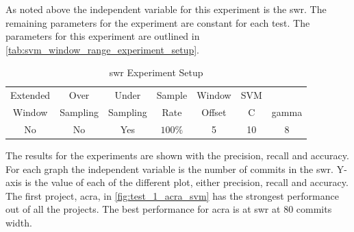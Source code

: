 
As noted above the independent variable for this experiment is the \gls{swr}. The remaining parameters for the experiment are constant for each test. The parameters for this experiment are outlined in \autoref{tab:svm_window_range_experiment_setup}.

\begin{table}[h]
\begin{center}

    \begin{tabular}{|c|c|c|c|c|cc|}
        \hline
        Extended & Over & Under & Sample & Window & SVM & \\
        Window & Sampling & Sampling & Rate & Offset & C & gamma \\ \hline
        No & No & Yes & $100\%$ & 5 & 10 & 8 \\ \hline
    \end{tabular}
    \caption{\gls{swr} Experiment Setup}
    \label{tab:svm_window_range_experiment_setup}
\end{center}

\end{table}

The results for the experiments are shown with the precision, recall and accuracy. For each graph the independent variable is the number of commits in the \gls{swr}. Y-axis is the value of each of the different plot, either precision, recall and accuracy. The first project, acra, in \autoref{fig:test_1_acra_svm} has the strongest performance out of all the projects. The best performance for acra is at \gls{swr} at 80 commits width.



